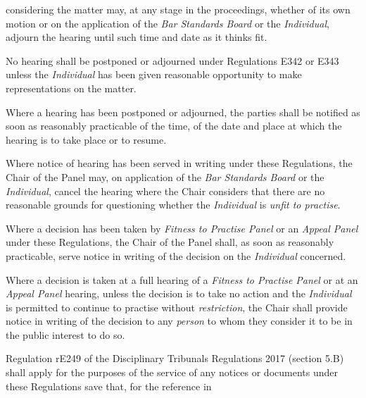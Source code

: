 considering the matter may, at any stage in the proceedings, whether of
its own motion or on the application of the \emph{Bar Standards
Board} or the \emph{ Individual}, adjourn the hearing until such time
and date as it thinks fit.\\
\par
No hearing shall be postponed or adjourned under Regulations E342 or
E343 unless the \emph{ Individual} has been given reasonable opportunity
to make representations on the matter. \\
\par
Where a hearing has been postponed or adjourned, the parties shall be
notified as soon as reasonably practicable of the time, of the date and
place at which the hearing is to take place or to resume.\\
\par
Where notice of hearing has been served in writing under these
Regulations, the Chair of the Panel may, on application of the \emph{Bar
Standards Board} or the \emph{Individual}, cancel the hearing where the
Chair considers that there are no reasonable grounds for questioning
whether the \emph{Individual} is \emph{unfit to practise}.\\
\par
{}
Where a decision has been taken by \emph{Fitness to Practise Panel} or
an \emph{Appeal Panel} under these Regulations, the Chair of the Panel
shall, as soon as reasonably practicable, serve notice in writing of the
decision on the \emph{Individual} concerned.\\
\par
Where a decision is taken at a full hearing of a \emph{Fitness to
Practise Panel} or at an \emph{Appeal Panel} hearing, unless the
decision is to take no action and the \emph{Individual} is permitted to
continue to practise without \emph{restriction}, the Chair shall provide
notice in writing of the decision to any \emph{person} to whom they
consider it to be in the public interest to do so.\\
\par
{}
Regulation rE249 of the Disciplinary Tribunals Regulations 2017 (section
5.B) shall apply for the purposes of the service of any notices or
documents under these Regulations save that, for the reference in
